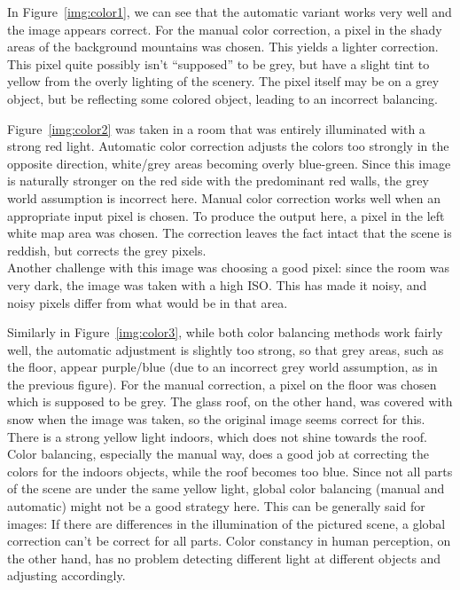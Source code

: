 \documentclass[11pt,a4]{article}
\begin{document}
In Figure~\ref{img:color1}, we can see that the automatic variant works very well and the image appears correct. For the manual color correction, a pixel in the shady areas of the background mountains was chosen. This yields a lighter correction. This pixel quite possibly isn't ``supposed'' to be grey, but have a slight tint to yellow from the overly lighting of the scenery. The pixel itself may be on a grey object, but be reflecting some colored object, leading to an incorrect balancing.

Figure~\ref{img:color2} was taken in a room that was entirely illuminated with a strong red light. Automatic color correction adjusts the colors too strongly in the opposite direction, white/grey areas becoming overly blue-green. Since this image is naturally stronger on the red side with the predominant red walls, the grey world assumption is incorrect here. Manual color correction works well when an appropriate input pixel is chosen. To produce the output here, a pixel in the left white map area was chosen. The correction leaves the fact intact that the scene is reddish, but corrects the grey pixels. \\
Another challenge with this image was choosing a good pixel: since the room was very dark, the image was taken with a high ISO. This has made it noisy, and noisy pixels differ from what would be in that area.

Similarly in Figure~\ref{img:color3}, while both color balancing methods work fairly well, the automatic adjustment is slightly too strong, so that grey areas, such as the floor, appear purple/blue (due to an incorrect grey world assumption, as in the previous figure). For the manual correction, a pixel on the floor was chosen which is supposed to be grey. The glass roof, on the other hand, was covered with snow when the image was taken, so the original image seems correct for this. There is a strong yellow light indoors, which does not shine towards the roof. Color balancing, especially the manual way, does a good job at correcting the colors for the indoors objects, while the roof becomes too blue. Since not all parts of the scene are under the same yellow light, global color balancing (manual and automatic) might not be a good strategy here. This can be generally said for images: If there are differences in the illumination of the pictured scene, a global correction can't be correct for all parts. Color constancy in human perception, on the other hand, has no problem detecting different light at different objects and adjusting accordingly.
\end{document}

